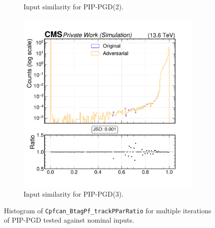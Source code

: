 \begin{figure}[h]
\begin{subfigure}[t]{0.32\textwidth}
    \caption*{Input similarity for PIP-PGD(2).}
  \end{subfigure}\hfill
  \begin{subfigure}[t]{0.32\textwidth}
    \includegraphics[width=\linewidth]{media/output/features/compare/combined_it_3/cmp_cpf_arr_Cpfcan_BtagPf_trackPParRatio.pdf}
    \caption*{Input similarity for PIP-PGD(3).}
  \end{subfigure}

  \caption*{Histogram of \texttt{Cpfcan\_BtagPf\_trackPParRatio} for multiple iterations of PIP-PGD tested against nominal inputs.}
  \label{fig:combined_input_Cpfcan_BtagPf_trackPParRatio}
\end{figure}

